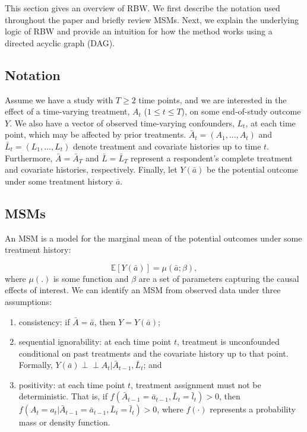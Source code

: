This section gives an overview of RBW. We first describe the notation
used throughout the paper and briefly review MSMs. Next, we explain the
underlying logic of RBW and provide an intuition for how the method
works using a directed acyclic graph (DAG).

\hypertarget{notation}{%
\subsection{Notation}\label{notation}}

Assume we have a study with \(T\ge2\) time points, and we are interested
in the effect of a time-varying treatment, \(A_{t}\) (\(1\le t \le T\)),
on some end-of-study outcome \(Y\). We also have a vector of observed
time-varying confounders, \(L_{t}\), at each time point, which may be
affected by prior treatments. \(\bar{A}_{t}=(A_{1},...,A_{t})\) and
\(\bar{L}_{t}=(L_{1},...,L_{t})\) denote treatment and covariate
histories up to time \(t\). Furthermore, \(\bar{A}=\bar{A}_{T}\) and
\(\bar{L}=\bar{L}_{T}\) represent a respondent's complete treatment and
covariate histories, respectively. Finally, let \(Y(\bar{a})\) be the
potential outcome under some treatment history \(\bar{a}\).

\hypertarget{msms}{%
\subsection{MSMs}\label{msms}}

An MSM is a model for the marginal mean of the potential outcomes under
some treatment history:

\begin{equation}
\label{eq:1}
\mathbb{E}[Y(\bar{a})]=\mu(\bar{a};\beta),
\end{equation}
where \(\mu(.)\) is some function and \(\beta\) are a set of parameters
capturing the causal effects of interest. We can identify an MSM from
observed data under three assumptions:

\begin{enumerate}
\def\labelenumi{\arabic{enumi}.}
\tightlist
\item
  consistency: if \(\bar{A}=\bar{a}\), then \(Y=Y(\bar{a})\);
\item
  sequential ignorability: at each time point \(t\), treatment is
  unconfounded conditional on past treatments and the covariate history
  up to that point. Formally,
  \(Y(\bar{a})\perp \!\!\! \perp A_{t}|\bar{A}_{t-1},\bar{L}_{t}\); and
\item
  positivity: at each time point \(t\), treatment assignment must not be
  deterministic. That is, if
  \(f(\bar{A}_{t-1}=\bar{a}_{t-1}, \bar{L}_{t}=\bar{l}_{t})>0\), then
  \(f(A_{t}=a_{t}|\bar{A}_{t-1}=\bar{a}_{t-1}, \bar{L}_{t}=\bar{l}_{t})>0\),
  where \(f(\cdot)\) represents a probability mass or density function.
\end{enumerate}


